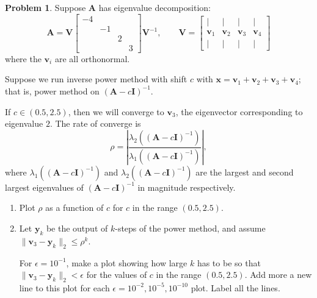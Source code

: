 \documentclass[12pt]{article}
\theoremstyle{definition}
\newtheorem{problem}{Problem}
\renewcommand{\vec}{\mathbf}
\begin{document}
\clearpage
\begin{problem}
Suppose $\vec{A}$ has eigenvalue decomposition:
\[
    \vec{A} 
    = 
    \vec{V}
    \begin{bmatrix}
        -4 \\ & -1 \\ && 2 \\ &&& 3
    \end{bmatrix}
    \vec{V}^{-1}
    ,\qquad
    \vec{V} = \begin{bmatrix} |&|&|&| \\ \vec{v}_1 & \vec{v}_2 & \vec{v}_3 & \vec{v}_4 \\ |&|&|&| \end{bmatrix}
    \]
where the $\vec{v}_i$ are all orthonormal.

    Suppose we run inverse power method with shift $c$ with $\vec{x} = \vec{v}_1 + \vec{v}_2 + \vec{v}_3 + \vec{v}_4$; that is, power method on $(\vec{A} - c\vec{I})^{-1}$.

    If $c\in(0.5,2.5)$, then we will converge to $\vec{v}_3$, the eigenvector corresponding to eigenvalue $2$.
    The rate of converge is
    \[
        \rho = \left| \frac{\lambda_2((\vec{A}-c\vec{I})^{-1})}{\lambda_1((\vec{A}-c\vec{I})^{-1})} \right|,
    \]
    where $\lambda_1((\vec{A}-c\vec{I})^{-1})$ and $\lambda_2((\vec{A}-c\vec{I})^{-1})$ are the largest and second largest eigenvalues of $(\vec{A} - c\vec{I})^{-1}$ in magnitude respectively.


    \begin{enumerate}
        \item Plot $\rho$ as a function of $c$ for $c$ in the range $(0.5, 2.5)$.

        \item Let $\vec{y}_k$ be the output of $k$-steps of the power method, and assume $\|\vec{v}_3 - \vec{y}_k\|_2 \leq \rho^k$.
            
            For $\epsilon = 10^{-1}$, make a plot showing how large $k$ has to be so that $\|\vec{v}_3 - \vec{y}_k\|_2 < \epsilon$ for the values of $c$ in the range $(0.5,2.5)$.
            Add more a new line to this plot for each $\epsilon = 10^{-2}, 10^{-5}, 10^{-10}$ plot. Label all the lines.

            

    \end{enumerate}




\end{problem}
\end{document}
